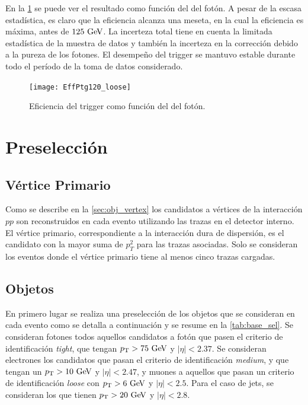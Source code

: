 En la \cref{fig:trigger_perf} se puede ver el resultado como función del {\pt}
del fotón.
A pesar de la escasa estadística, es claro que la eficiencia alcanza una meseta,
en la cual la eficiencia es máxima, antes de $125 \gev$. La incerteza total
tiene en cuenta la limitada estadística de la muestra de datos y también la
incerteza en la corrección debido a la pureza de los fotones. El desempeño del
trigger se mantuvo estable durante todo el período de la toma de datos
considerado.

\begin{figure}[!htb]
  \centering

  \texttt{[image: EffPtg120\_loose]}

  \caption{Eficiencia del trigger {\trigchain} como función del {\pt} del fotón.}
  \label{fig:trigger_perf}
\end{figure}


\section{Preselección}
\label{sec:base_seleccion}

\subsection{Vértice Primario}

Como se describe en la \cref{sec:obj_vertex} los candidatos a vértices de la interacción $pp$ son
reconstruidos en cada evento utilizando las trazas en el detector interno. El
vértice primario, correspondiente a la interacción dura de dispersión, es el
candidato con la mayor suma de $p_{T}^{2}$ para las trazas asociadas. Solo se
consideran los eventos donde el vértice primario tiene al menos cinco trazas
cargadas.


\subsection{Objetos}
\label{sec:preselection}

En primero lugar se realiza una preselección de los objetos que se consideran en cada
evento como se detalla a continuación y se resume en la \cref{tab:base_sel}. Se
consideran fotones todos aquellos candidatos a fotón que pasen el criterio de
identificación \emph{tight}, que tengan $\pt>75\gev$ y $|\eta|<2.37$. Se
consideran electrones los candidatos que pasan el criterio de identificación \emph{medium}, y
que tengan un $\pt>10\gev$ y $|\eta|<2.47$, y muones a aquellos que pasan un criterio de
identificación \emph{loose} con $\pt>6 \gev$ y $|\eta|<2.5$. Para el caso de
jets, se consideran los que tienen $\pt>20\gev$ y $|\eta|<2.8$.


